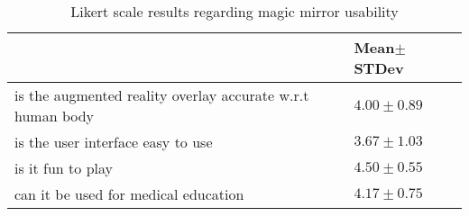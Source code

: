 \begin{table}
	\caption{Likert scale results regarding magic mirror usability}
	\label{tb:3-PRMM:results2}
	\scriptsize
	\begin{center}
		\begin{tabular}{p{6cm}|p{3cm}}
			\space & Mean$\pm$ STDev \\
			\hline
			is the augmented reality overlay accurate w.r.t human body & $4.00\pm0.89$\\
			is the user interface easy to use & $3.67\pm1.03$ \\
			is it fun to play & $4.50\pm0.55$\\
			can it be used for medical education & $4.17\pm0.75$
		\end{tabular}
	\end{center}
\end{table}